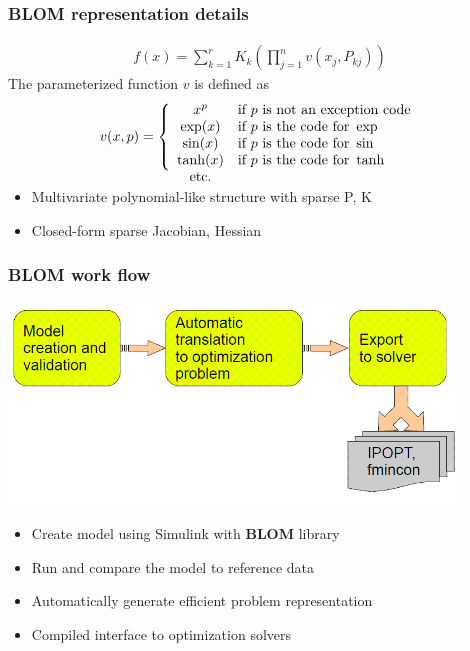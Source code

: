 \documentclass[mathserif]{beamer}
\newcommand{\BLOM}{{\bf BLOM }}
\begin{document}
\begin{frame}
\frametitle{ \BLOM representation details}
\begin{gather*}
f(x) = \sum_{k=1}^r K_{k} \left( \prod_{j=1}^n v(x_j, P_{kj}) \right) 
\label{eq:polyblock_eq}
\end{gather*}
The parameterized function $v$ is defined as
\begin{equation*}
v(x, p) = \left\{ \begin{array}{cl}
x^p & \text{if } p \text{ is not an exception code} \\
\exp(x) & \text{if } p \text{ is the code for } \exp \\
\sin(x) & \text{if } p \text{ is the code for } \sin \\
\tanh(x) & \text{if } p \text{ is the code for } \tanh \\
\text{etc.} \vspace{-10pt}
\end{array} \right.
\label{eq:v_definition}
\end{equation*}
\begin{itemize}
\item	Multivariate polynomial-like structure with sparse P, K
\item	Closed-form sparse Jacobian, Hessian
\end{itemize}
\end{frame}


\begin{frame}
\frametitle{\BLOM work flow}
\includegraphics[width=0.9\textwidth]{WorkFlowBlom}

\begin{itemize}
\item Create model using Simulink with \BLOM library
\item Run and compare the model to reference data
\item Automatically generate efficient problem representation
\item Compiled interface to optimization solvers
\end{itemize}

\end{frame}
\end{document}
